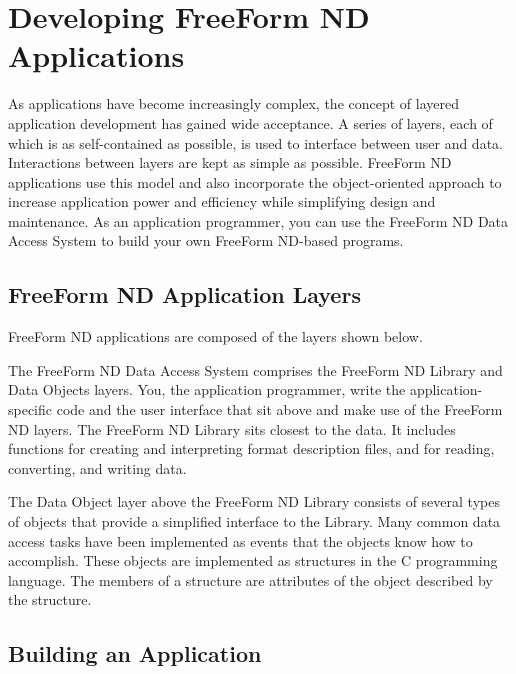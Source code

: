 %
%

\chapter{Developing FreeForm ND Applications}
\label{ff,develop}

As applications have become increasingly complex, the concept of
layered application development has gained wide acceptance. A series
of layers, each of which is as self-contained as possible, is used to
interface between user and data. Interactions between layers are kept
as simple as possible. FreeForm ND applications use this model and
also incorporate the object-oriented approach to increase application
power and efficiency while simplifying design and maintenance. As an
application programmer, you can use the FreeForm ND Data Access System
to build your own FreeForm ND-based programs.

\section{FreeForm ND Application Layers}

FreeForm ND applications are composed of the layers shown below.

The FreeForm ND Data Access System comprises the FreeForm ND Library
and Data Objects layers. You, the application programmer, write the
application-specific code and the user interface that sit above and
make use of the FreeForm ND layers. The FreeForm ND Library sits
closest to the data. It includes functions for creating and
interpreting format description files, and for reading, converting,
and writing data.

The Data Object layer above the FreeForm ND Library consists of
several types of objects that provide a simplified interface to the
Library. Many common data access tasks have been implemented as events
that the objects know how to accomplish. These objects are implemented
as structures in the C programming language. The members of a
structure are attributes of the object described by the structure.

\section{Building an Application}

